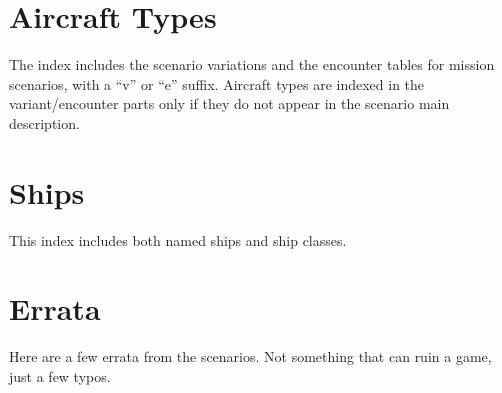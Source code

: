 \documentclass[a4paper,twocolumn]{article}
\begin{document}
\section*{Aircraft Types}

The index includes the scenario variations and the encounter
tables for mission scenarios, with a ``v'' or ``e''
suffix. Aircraft types are indexed in the variant/encounter parts only if they do not appear in the
scenario main description.

\vspace{2mm}

\begin{hangparas}{4mm}{1}
\end{hangparas}

\section*{Ships}

This index includes both named ships and ship classes.

\vspace{2mm}

\begin{hangparas}{4mm}{1}
\end{hangparas}

\section*{Errata}

Here are a few errata from the scenarios. Not something that can ruin a game, just
a few typos.

\vspace{3mm}

\begin{hangparas}{4mm}{1}
\end{hangparas}
\end{document}
